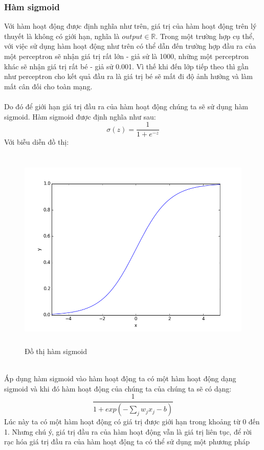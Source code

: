 \subsubsection{Hàm sigmoid}
Với hàm hoạt động được định nghĩa như trên, giá trị của hàm hoạt động trên lý 
thuyết là không có giới hạn, nghĩa là $output\in\mathbb{R}$. Trong một trường 
hợp cụ thể, với việc sử dụng hàm hoạt động như trên có thể dẫn đến trường hợp 
đầu ra của một perceptron sẽ nhận giá trị rất lớn - giả sử là 1000, những một 
perceptron khác sẽ nhận giá trị rất bé - giả sử 0.001. Vì thế khi đến lớp tiếp 
theo thì gần như perceptron cho kết quả đầu ra là giá trị bé sẽ mất đi độ ảnh 
hưởng và làm mất cân đối cho toàn mạng.\\\\
Do đó để giới hạn giá trị đầu ra của hàm hoạt động chúng ta sẽ sử dụng hàm 
sigmoid. Hàm sigmoid được định nghĩa như sau:\\
\[
  \sigma(z)=\frac{1}{1+e^{-z}}
\]
Với biễu diễn đồ thị:
\begin{figure}[h!]
\centering
\includegraphics[height=3.85in, keepaspectratio=true]{sigmoid.png}
\caption{Đồ thị hàm sigmoid}
\end{figure}\\
Áp dụng hàm sigmoid vào hàm hoạt động ta có một hàm hoạt động dạng sigmoid và 
khi đó hàm hoạt động của chúng ta của chúng ta sẽ có dạng:\\
\[
  \frac{1}{1+exp(-\sum_j w_j x_j -b)}
\]
Lúc này ta có một hàm hoạt động có giá trị được giới hạn trong khoảng từ 0 đến 
1. Nhưng chú ý, giá trị đầu ra của hàm hoạt động vẫn là giá trị liên tục, để 
rời rạc hóa giá trị đầu ra của hàm hoạt động ta có thể sử dụng một phương pháp 
